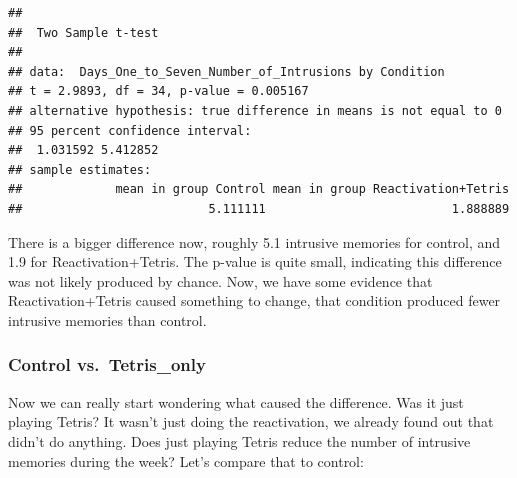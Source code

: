 \documentclass[]{book}
\newenvironment{Shaded}{\begin{snugshade}}{\end{snugshade}}
\newcommand{\KeywordTok}[1]{\textcolor[rgb]{0.13,0.29,0.53}{\textbf{{#1}}}}
\newcommand{\DataTypeTok}[1]{\textcolor[rgb]{0.13,0.29,0.53}{{#1}}}
\newcommand{\StringTok}[1]{\textcolor[rgb]{0.31,0.60,0.02}{{#1}}}
\newcommand{\OtherTok}[1]{\textcolor[rgb]{0.56,0.35,0.01}{{#1}}}
\newcommand{\NormalTok}[1]{{#1}}
\theoremstyle{definition}
\theoremstyle{definition}
\theoremstyle{definition}
\theoremstyle{remark}
\begin{document}
\begin{Shaded}
\end{Shaded}

\begin{verbatim}
## 
##  Two Sample t-test
## 
## data:  Days_One_to_Seven_Number_of_Intrusions by Condition
## t = 2.9893, df = 34, p-value = 0.005167
## alternative hypothesis: true difference in means is not equal to 0
## 95 percent confidence interval:
##  1.031592 5.412852
## sample estimates:
##             mean in group Control mean in group Reactivation+Tetris 
##                          5.111111                          1.888889
\end{verbatim}

There is a bigger difference now, roughly 5.1 intrusive memories for
control, and 1.9 for Reactivation+Tetris. The p-value is quite small,
indicating this difference was not likely produced by chance. Now, we
have some evidence that Reactivation+Tetris caused something to change,
that condition produced fewer intrusive memories than control.

\subsubsection{Control vs.~Tetris\_only}\label{control-vs.tetris_only}

Now we can really start wondering what caused the difference. Was it
just playing Tetris? It wasn't just doing the reactivation, we already
found out that didn't do anything. Does just playing Tetris reduce the
number of intrusive memories during the week? Let's compare that to
control:

\begin{Shaded}
\end{Shaded}
\end{document}
